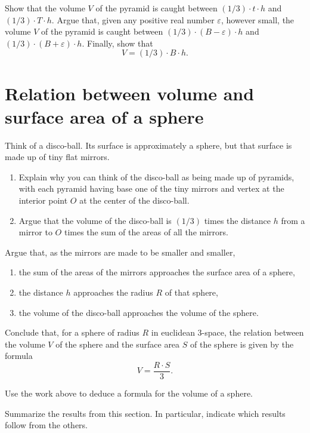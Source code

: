 \documentclass{ximera}
\begin{document}
\begin{problem}
Show that the volume $V$ of the pyramid is caught between $\left(
1/3\right) \cdot t\cdot h$ and $\left( 1/3\right) \cdot T\cdot
h$. Argue that, given any positive real number $\varepsilon$, however
small, the volume $V$ of the pyramid is caught between $\left(
1/3\right) \cdot \left( B-\varepsilon\right)\cdot h$ and $\left(
1/3\right) \cdot \left( B+\varepsilon\right) \cdot h$. Finally, show that
\[
V=\left(  1/3\right)  \cdot B\cdot h.
\]
\end{problem}

\section{Relation between volume and surface area of a sphere}

Think of a disco-ball. Its surface is approximately a sphere, but that
surface is made up of tiny flat mirrors.

\begin{problem}\hfil
\begin{enumerate}
\item Explain why you can think of the disco-ball as being made up of
  pyramids, with each pyramid having base one of the tiny mirrors and
  vertex at the interior point $O$ at the center of the disco-ball.
\item Argue that the volume of the disco-ball is $\left( 1/3\right) $
  times the distance $h$ from a mirror to $O$ times the sum of the
  areas of all the mirrors.
\end{enumerate}
\end{problem}

\begin{problem}
Argue that, as the mirrors are made to be smaller and smaller,
\begin{enumerate}
\item the sum of the areas of the mirrors approaches the surface area of a sphere,
\item the distance $h$ approaches the radius $R$ of that sphere,
\item the volume of the disco-ball approaches the volume of the sphere.
\end{enumerate}
Conclude that, for a sphere of radius $R$ in euclidean $3$-space, the relation
between the volume $V$ of the sphere and the surface area $S$ of the sphere is
given by the formula%
\[
V=\frac{R\cdot S}{3}.
\]
\end{problem}

\begin{problem}
Use the work above to deduce a formula for the volume of a sphere.
\end{problem}




\begin{problem}
Summarize the results from this section. In particular, indicate which
results follow from the others.
\begin{freeResponse}
\end{freeResponse}
\end{problem}
\end{document}
